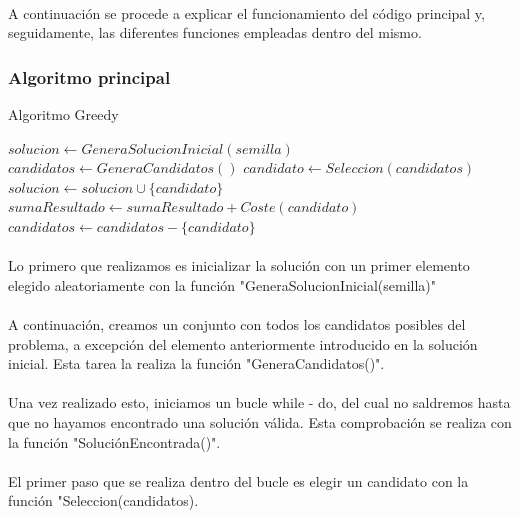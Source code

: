 \documentclass{article}
\begin{document}
		\paragraph{}A continuación se procede a explicar el funcionamiento del código principal y, seguidamente, las diferentes funciones empleadas dentro del mismo.
	
	\subsubsection{Algoritmo principal}
		\begin{algorithm}[H]
			\caption{Algoritmo Greedy}
			\begin{algorithmic}
				\STATE $solucion \leftarrow GeneraSolucionInicial(semilla)$
				\STATE $candidatos \leftarrow GeneraCandidatos()$
				\STATE $candidato \leftarrow Seleccion(candidatos)$
				\STATE $solucion \leftarrow solucion \cup \{candidato\}$
				\STATE $sumaResultado \leftarrow sumaResultado + Coste(candidato)$
				\ENDIF
				\STATE $candidatos \leftarrow candidatos - \{ candidato \}$
				\ENDWHILE
			\end{algorithmic}
		\end{algorithm}
	
		\paragraph{}Lo primero que realizamos es inicializar la solución con un primer elemento elegido aleatoriamente con la función "GeneraSolucionInicial(semilla)"
		
		\paragraph{}A continuación, creamos un conjunto con todos los candidatos posibles del problema, a excepción del elemento anteriormente introducido en la solución inicial. Esta tarea la realiza la función "GeneraCandidatos()".
		
		\paragraph{}Una vez realizado esto, iniciamos un bucle while - do, del cual no saldremos hasta que no hayamos encontrado una solución válida. Esta comprobación se realiza con la función "SoluciónEncontrada()".
		
		\paragraph{}El primer paso que se realiza dentro del bucle es elegir un candidato con la función "Seleccion(candidatos).
		
\end{document}
